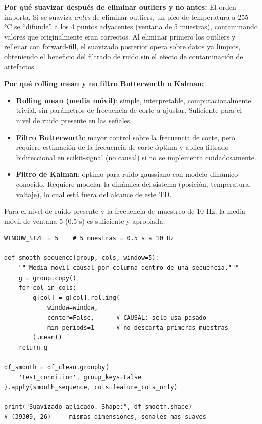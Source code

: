 \documentclass[12pt,a4paper]{article}
\begin{document}
\begin{whybox}
\textbf{Por qué suavizar después de eliminar outliers y no antes:}
El orden importa. Si se suaviza \emph{antes} de eliminar outliers, un pico de
temperatura a 255 °C se ``difunde'' a los 4 puntos adyacentes (ventana de 5 muestras),
contaminando valores que originalmente eran correctos. Al eliminar primero los outliers
y rellenar con forward-fill, el suavizado posterior opera sobre datos ya limpios,
obteniendo el beneficio del filtrado de ruido sin el efecto de contaminación de
artefactos.

\textbf{Por qué rolling mean y no filtro Butterworth o Kalman:}
\begin{itemize}[leftmargin=1.5em]
  \item \textbf{Rolling mean (media móvil)}: simple, interpretable, computacionalmente
    trivial, sin parámetros de frecuencia de corte a ajustar. Suficiente para el
    nivel de ruido presente en las señales.
  \item \textbf{Filtro Butterworth}: mayor control sobre la frecuencia de corte,
    pero requiere estimación de la frecuencia de corte óptima y aplica filtrado
    bidireccional en scikit-signal (no causal) si no se implementa cuidadosamente.
  \item \textbf{Filtro de Kalman}: óptimo para ruido gaussiano con modelo dinámico
    conocido. Requiere modelar la dinámica del sistema (posición, temperatura, voltaje),
    lo cual está fuera del alcance de este TD.
\end{itemize}

Para el nivel de ruido presente y la frecuencia de muestreo de 10 Hz, la media
móvil de ventana 5 (0.5 s) es suficiente y apropiada.
\end{whybox}

\begin{lstlisting}[caption={Suavizado con media móvil causal por secuencia}, label={lst:smooth}]
WINDOW_SIZE = 5    # 5 muestras = 0.5 s a 10 Hz

def smooth_sequence(group, cols, window=5):
    """Media movil causal por columna dentro de una secuencia."""
    g = group.copy()
    for col in cols:
        g[col] = g[col].rolling(
            window=window,
            center=False,      # CAUSAL: solo usa pasado
            min_periods=1      # no descarta primeras muestras
        ).mean()
    return g

df_smooth = df_clean.groupby(
    'test_condition', group_keys=False
).apply(smooth_sequence, cols=feature_cols_only)

print("Suavizado aplicado. Shape:", df_smooth.shape)
# (39309, 26)  -- mismas dimensiones, senales mas suaves
\end{lstlisting}
\end{document}

